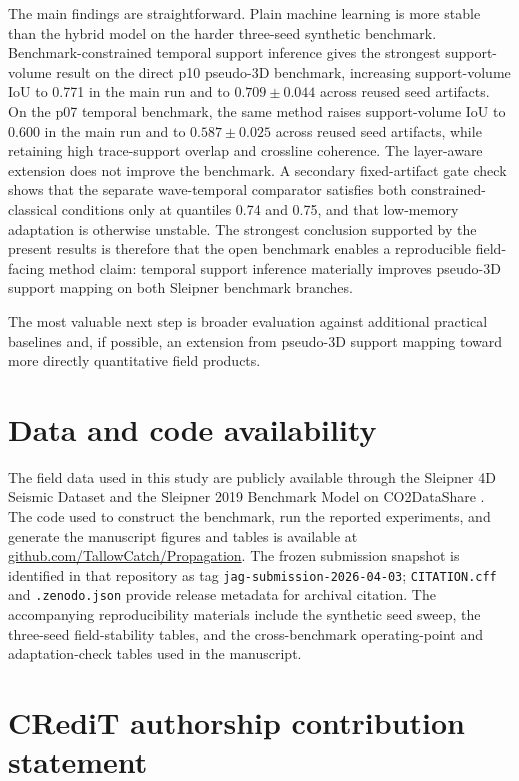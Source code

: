 \documentclass[preprint,12pt]{elsarticle}
\begin{document}
The main findings are straightforward. Plain machine learning is more stable than the hybrid model on the harder three-seed synthetic benchmark. Benchmark-constrained temporal support inference gives the strongest support-volume result on the direct p10 pseudo-3D benchmark, increasing support-volume IoU to 0.771 in the main run and to $0.709 \pm 0.044$ across reused seed artifacts. On the p07 temporal benchmark, the same method raises support-volume IoU to 0.600 in the main run and to $0.587 \pm 0.025$ across reused seed artifacts, while retaining high trace-support overlap and crossline coherence. The layer-aware extension does not improve the benchmark. A secondary fixed-artifact gate check shows that the separate wave-temporal comparator satisfies both constrained-classical conditions only at quantiles 0.74 and 0.75, and that low-memory adaptation is otherwise unstable. The strongest conclusion supported by the present results is therefore that the open benchmark enables a reproducible field-facing method claim: temporal support inference materially improves pseudo-3D support mapping on both Sleipner benchmark branches.

The most valuable next step is broader evaluation against additional practical baselines and, if possible, an extension from pseudo-3D support mapping toward more directly quantitative field products.

\section*{Data and code availability}

The field data used in this study are publicly available through the Sleipner 4D Seismic Dataset and the Sleipner 2019 Benchmark Model on CO2DataShare \citep{equinor2020seismic,equinor2020benchmark}. The code used to construct the benchmark, run the reported experiments, and generate the manuscript figures and tables is available at \href{https://github.com/TallowCatch/Propagation}{github.com/TallowCatch/Propagation}. The frozen submission snapshot is identified in that repository as tag \texttt{jag-submission-2026-04-03}; \texttt{CITATION.cff} and \texttt{.zenodo.json} provide release metadata for archival citation. The accompanying reproducibility materials include the synthetic seed sweep, the three-seed field-stability tables, and the cross-benchmark operating-point and adaptation-check tables used in the manuscript.

\section*{CRediT authorship contribution statement}
\end{document}
